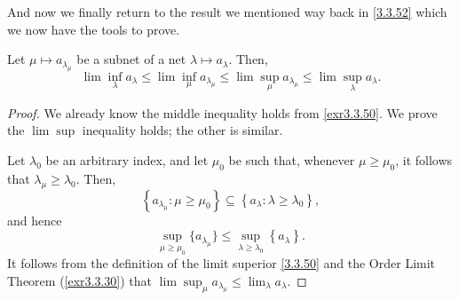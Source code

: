 And now we finally return to the result we mentioned way back in \cref{3.3.52} which we now have the tools to prove.
\begin{prp}
Let $\mu \mapsto a_{\lambda _\mu}$ be a subnet of a net $\lambda \mapsto a_\lambda$.  Then,
\begin{equation}
\lim \inf _\lambda a_\lambda \leq \lim \inf _\mu a_{\lambda _\mu}\leq \lim \sup _\mu a_{\lambda _\mu}\leq \lim \sup _\lambda a_\lambda .
\end{equation}
\begin{proof}
We already know the middle inequality holds from \cref{exr3.3.50}.  We prove the $\lim \sup$ inequality holds; the other is similar.

Let $\lambda _0$ be an arbitrary index, and let $\mu _0$ be such that, whenever $\mu \geq \mu _0$, it follows that $\lambda _\mu \geq \lambda _0$.  Then,
\begin{equation}
\left\{ a_{\lambda _\mu}:\mu \geq \mu _0\right\} \subseteq \left\{ a_\lambda :\lambda \geq \lambda _0\right\} ,
\end{equation}
and hence
\begin{equation}
\sup _{\mu \geq \mu _0}\{ a_{\lambda _\mu}\} \leq \sup _{\lambda \geq \lambda _0}\left\{ a_\lambda \right\} .
\end{equation}
It follows from the definition of the limit superior \eqref{3.3.50} and the Order Limit Theorem (\cref{exr3.3.30}) that $\lim \sup _\mu a_{\lambda _\mu}\leq \lim _\lambda a_\lambda$.
\end{proof}
\end{prp}
